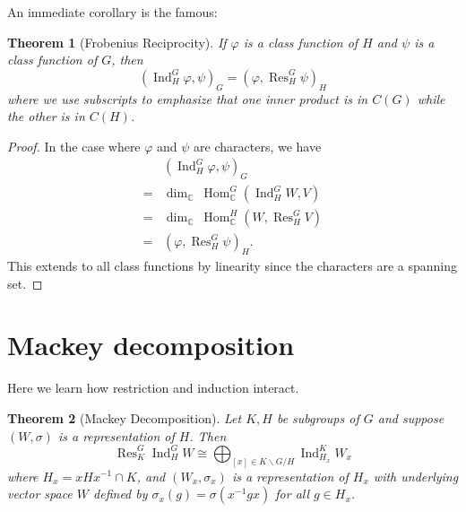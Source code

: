 \documentclass[12pt]{article}
\theoremstyle{plain}
\newtheorem{theorem}{Theorem}[section]
\theoremstyle{definition}
\theoremstyle{remark}
\numberwithin{equation}{section}
\begin{document}
An immediate corollary is the famous:

\begin{theorem}[Frobenius Reciprocity]
If $\varphi$ is a class function of $H$ and $\psi$ is a class function
of $G$, then
\[
(\operatorname{Ind}_H^G \varphi, \psi)_G
=
(\varphi, \operatorname{Res}_H^G \psi)_H
\]
where we use subscripts to emphasize that one inner product is in $C(G)$
while the other is in $C(H)$.
\end{theorem}

\begin{proof}
In the case where $\varphi$ and $\psi$ are characters,
we have
\begin{align*}
&(\operatorname{Ind}_H^G \varphi, \psi)_G\\
=& \dim_\mathbb{C}\ \operatorname{Hom}^G_\mathbb{C}(\operatorname{Ind}_H^G W, V)\\
=& \dim_\mathbb{C}\ \operatorname{Hom}^H_\mathbb{C}(W,\operatorname{Res}_H^G  V)\\
=&(\varphi, \operatorname{Res}_H^G \psi)_H .
\end{align*}
This extends to all class functions by linearity since the characters
are a spanning set.
\end{proof}

\section{Mackey decomposition}

Here we learn how restriction and induction interact.

\begin{theorem}[Mackey Decomposition]
Let $K,H$ be subgroups of $G$ and suppose $(W,\sigma)$ is a representation of
$H$.
Then
\[
\operatorname{Res}^G_K \operatorname{Ind}^G_H W
\cong
\bigoplus_{[x] \in K\backslash G / H}
\operatorname{Ind}_{H_x}^K W_x
\]
where $H_x = xHx^{-1} \cap K$, and $(W_x,\sigma_x)$ is a representation
of $H_x$ with underlying vector space $W$
defined by $\sigma_x(g)=\sigma(x^{-1}gx)$ for all $g \in H_x$.
\end{theorem}
\end{document}

